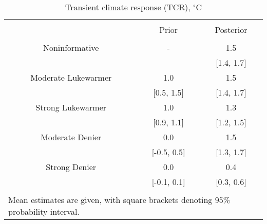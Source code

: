 
\begin{table}[!htbp] \centering 
  \caption{Transient climate response (TCR), $^\circ$C} 
  \label{tab:tcr-tab} 
\begin{tabular}{@{\extracolsep{5pt}} ccc} 
\\[-1.8ex]\hline 
\hline \\[-1.8ex] 
 & Prior & Posterior \\ 
\hline \\[-1.8ex] 
Noninformative & - & 1.5 \\ 
 &  & [1.4, 1.7] \\ 
Moderate Lukewarmer & 1.0 & 1.5 \\ 
 & [0.5, 1.5] & [1.4, 1.7] \\ 
Strong Lukewarmer & 1.0 & 1.3 \\ 
 & [0.9, 1.1] & [1.2, 1.5] \\ 
Moderate Denier & 0.0 & 1.5 \\ 
 & [-0.5, 0.5] & [1.3, 1.7] \\ 
Strong Denier & 0.0 & 0.4 \\ 
 & [-0.1, 0.1] & [0.3, 0.6] \\ 
\hline \\[-1.8ex] 
\multicolumn{3}{l}{\footnotesize Mean estimates are given, with square brackets denoting 95\% probability interval.} \\ 
\end{tabular} 
\end{table} 

